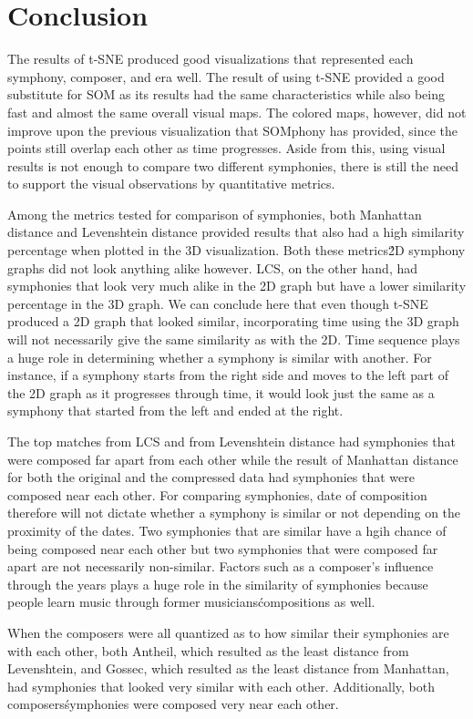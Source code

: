 \chapter{Conclusion}
The results of t-SNE produced good visualizations that represented each symphony, composer, and era well. The result of using t-SNE provided a good substitute for SOM as its results had the same characteristics while also being fast and almost the same overall visual maps. The colored maps, however, did not improve upon the previous visualization that SOMphony has provided, since the points still overlap each other as time progresses. Aside from this, using visual results is not enough to compare two different symphonies, there is still the need to support the visual observations by quantitative metrics. 

Among the metrics tested for comparison of symphonies, both Manhattan distance and Levenshtein distance provided results that also had a high similarity percentage when plotted in the 3D visualization. Both these metrics\' 2D symphony graphs did not look anything alike however. LCS, on the other hand, had symphonies that look very much alike in the 2D graph but have a lower similarity percentage in the 3D graph. We can conclude here that even though t-SNE produced a 2D graph that looked similar, incorporating time using the 3D graph will not necessarily give the same similarity as with the 2D. Time sequence plays a huge role in determining whether a symphony is similar with another. For instance, if a symphony starts from the right side and moves to the left part of the 2D graph as it progresses through time, it would look just the same as a symphony that started from the left and ended at the right.

The top matches from LCS and from Levenshtein distance had symphonies that were composed far apart from each other while the result of Manhattan distance for both the original and the compressed data had symphonies that were composed near each other. For comparing symphonies, date of composition therefore will not dictate whether a symphony is similar or not depending on the proximity of the dates. Two symphonies that are similar have a hgih chance of being composed near each other but two symphonies that were composed far apart are not necessarily non-similar. Factors such as a composer's influence through the years plays a huge role in the similarity of symphonies because people learn music through former musicians\' compositions as well.

When the composers were all quantized as to how similar their symphonies are with each other, both Antheil, which resulted as the least distance from Levenshtein, and Gossec, which resulted as the least distance from Manhattan, had symphonies that looked very similar with each other. Additionally, both composers\' symphonies were composed very near each other.

